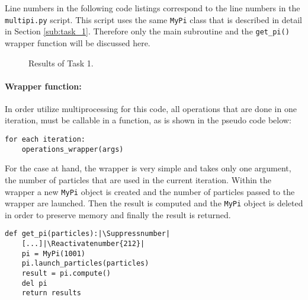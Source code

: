 \documentclass{aa}
\begin{document}
Line numbers in the following code listings correspond to the line numbers in the
\verb+multipi.py+ script. This script uses the same \verb+MyPi+ class that is described in
detail in Section \ref{sub:task_1}. Therefore only the main subroutine and the \verb+get_pi()+
wrapper function will be discussed here.

\begin{figure*}[htbp]
    \centering
    \captionsetup{width = 0.9 \linewidth}
    \caption{Results of Task 1.}
    \label{fig:Pi_final}
\end{figure*}

\paragraph{Wrapper function:} In order utilize multiprocessing for this code, all operations
that are done in one iteration, must be callable in a function, as is shown in the pseudo code
below:
\begin{lstlisting}[numbers=none]
for each iteration:
    operations_wrapper(args)
\end{lstlisting}
For the case at hand, the wrapper is very simple and takes only one argument, the number of
particles that are used in the current iteration. Within the wrapper a new \verb+MyPi+ object
is created and the number of particles passed to the wrapper are launched. Then the result is
computed and the \verb+MyPi+ object is deleted in order to preserve memory and finally the
result is returned.
\begin{lstlisting}[firstnumber=210]
def get_pi(particles):|\Suppressnumber|
    [...]|\Reactivatenumber{212}|
    pi = MyPi(1001)
    pi.launch_particles(particles)
    result = pi.compute()
    del pi
    return results
\end{lstlisting}
\end{document}
